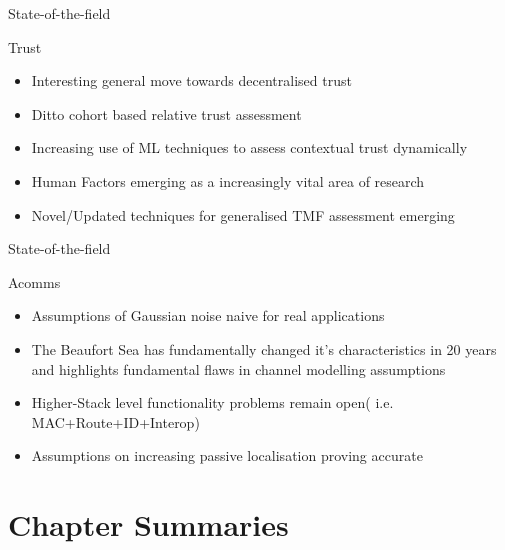 \documentclass[aspectratio=169]{beamer}
\begin{document}
\begin{frame}{State-of-the-field}
	\begin{block}{Trust}
		\begin{itemize}
			\item Interesting general move towards decentralised trust\cite{Korzun2015}
			\item Ditto cohort based relative trust assessment \cite{Singh2016}
			\item Increasing use of ML techniques to assess contextual trust dynamically \cite{Rishwaraj2017} 
			\item Human Factors emerging as a increasingly vital area of research \cite{Saeidi2009,Matthews2016,Lahijanian2016}
			\item Novel/Updated techniques for generalised TMF assessment emerging \cite{Janiszewski2016} 
		\end{itemize}
	\end{block}
	
\end{frame}

\begin{frame}{State-of-the-field}
	\begin{block}{Acomms} %
		\begin{itemize}
			\item Assumptions of Gaussian noise naive for real applications \cite{Mahmood2016, Deane2016}
			\item The Beaufort Sea has fundamentally changed it's characteristics in 20 years and highlights fundamental flaws in channel modelling assumptions \cite{Schmidt2016}
			\item Higher-Stack level functionality problems remain open( i.e. MAC+Route+ID+Interop) \cite{Diamant2016 ,Petroccia2016a,Petroccia2016b, Anjangi2016}
			\item Assumptions on increasing passive localisation proving accurate \cite{Vio2016, Ferreira2016,Das2016}
		\end{itemize}
	\end{block}
	
\end{frame}

\section{Chapter Summaries}
\end{document}

